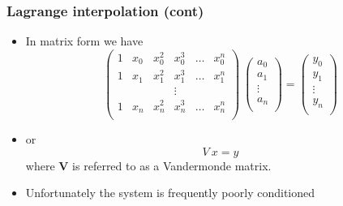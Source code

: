 \documentclass[10pt]{beamer}
\begin{document}
\begin{frame}
  \frametitle{Lagrange interpolation (cont)}
  \begin{itemize}
  \item In matrix form we have
    \[
      \left(
        \begin{array}{cccccc}
          1 & x_0 & x_0^2 & x_0^3 & \ldots & x_0^n \\
          1 & x_1 & x_1^2 & x_1^3 & \ldots & x_1^n \\
            &     &       & \vdots &       &       \\
          1 & x_n & x_n^2 & x_n^3 & \ldots & x_n^n \\
        \end{array}
      \right)
      ~
      \left(
        \begin{array}{c}
          a_0 \\ a_1 \\ \vdots \\ a_n \\
        \end{array}
      \right)
      =
      \left(
        \begin{array}{c}
          y_0 \\ y_1 \\ \vdots \\ y_n \\
        \end{array}
      \right)
    \]
  \item or
    \[ V~x = y \]
    where $\mathbf{V}$ is referred to as a Vandermonde matrix.
  \item Unfortunately the system is frequently poorly conditioned      
  \end{itemize}
\end{frame}
\end{document}
